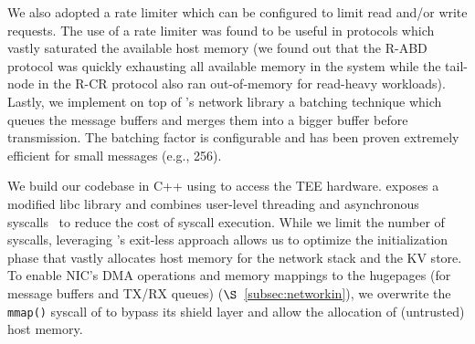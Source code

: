 We also adopted a rate limiter which can be configured to limit read and/or write requests. The use of a rate limiter was found to be useful in protocols which vastly saturated the available host memory (we found out that the R-ABD protocol was quickly exhausting all available memory in the system while the tail-node in the R-CR protocol also ran out-of-memory for read-heavy workloads). Lastly, we implement on top of \projecttitle{}'s network library a batching technique which queues the message buffers and merges them into a bigger buffer before transmission. The batching factor is configurable and has been proven extremely efficient for small messages (e.g., \SI{256}{\byte}).

\fi 


 We build our codebase in C++ using \scone{} to access the TEE hardware. \scone{} exposes a modified libc library and combines user-level threading and asynchronous syscalls~\cite{flexsc} to reduce the cost of syscall execution. While we limit the number of syscalls, leveraging  \scone{}'s exit-less approach allows us to optimize the initialization phase that vastly allocates host memory for the network stack and the KV store. To enable NIC's DMA operations and memory mappings to the hugepages (for message buffers and TX/RX queues) ($\S$~\ref{subsec:networkin}), we overwrite the \texttt{mmap()} syscall of \scone{} to bypass its shield layer and allow the allocation of (untrusted) host memory. 



